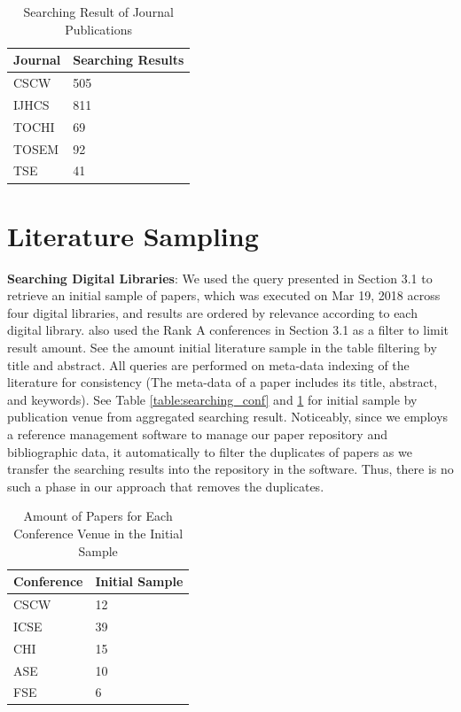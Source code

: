 \begin{table}[tbp]
\centering
\begin{tabular}{ll}
\hline
\textbf{Journal} & \textbf{Searching Results} \\ \hline
CSCW    & 505               \\
IJHCS   & 811               \\ 
TOCHI   & 69                \\
TOSEM   & 92                \\
TSE     & 41                \\ \hline
\end{tabular}
\caption{Searching Result of Journal Publications}
\label{table:searching_jour}
\end{table}

\section{Literature Sampling}

\textbf{Searching Digital Libraries}: We used the query presented in Section 3.1 to retrieve an initial sample of papers, which was executed on Mar 19, 2018 across four digital libraries, and results are ordered by relevance according to each digital library.  also used the Rank A conferences in Section 3.1 as a filter to limit result amount. See the amount initial literature sample in the table filtering by title and abstract. All queries are performed on meta-data indexing of the literature for consistency (The meta-data of a paper includes its title, abstract, and keywords).  See Table \ref{table:searching_conf} and \ref{table:searching_jour} for initial sample by publication venue from aggregated searching result. Noticeably, since we employs a reference management software to manage our paper repository and bibliographic data, it automatically to filter the duplicates of papers as we transfer the searching results into the repository in the software. Thus, there is no such a phase in our approach that removes the duplicates.

\begin{table}[tbp]
\centering
\begin{tabular}{ll}
\hline
\textbf{Conference} & \textbf{Initial Sample} \\ \hline
CSCW       & 12             \\ 
ICSE       & 39             \\ 
CHI        & 15             \\ 
ASE        & 10             \\ 
FSE        & 6              \\ \hline
\end{tabular}
\caption{Amount of Papers for Each Conference Venue in the Initial Sample}
\label{table:sample1_conf}
\end{table}

